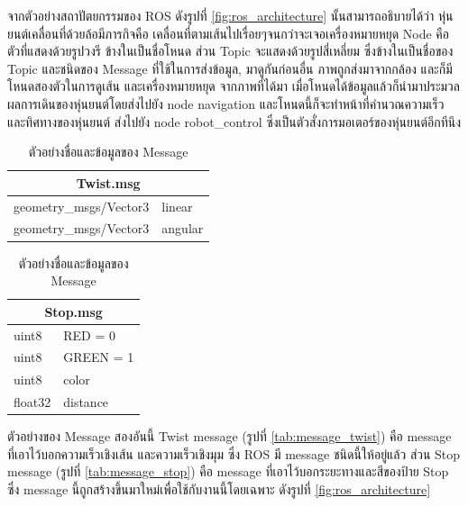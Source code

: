 จากตัวอย่างสถาปัตยกรรมของ ROS ดังรูปที่ \ref{fig:ros_architecture} นั้นสามารถอธิบายได้ว่า หุ่นยนต์เคลื่อนที่ด้วยล้อมีภารกิจคือ
เคลื่อนที่ตามเส้นไปเรื่อยๆจนกว่าจะเจอเครื่องหมายหยุด Node คือตัวที่แสดงด้วยรูปวงรี ข้างในเป็นชื่อโหนด ส่วน Topic จะแสดงด้วยรูปสี่เหลี่ยม
ซึ่งข้างในเป็นชื่อของ Topic และชนิดของ Message ที่ใช้ในการส่งข้อมูล, มาดูกันก่อนอื่น ภาพถูกส่งมาจากกล้อง และก็มีโหนดสองตัวในการดูเส้น และเครื่องหมายหยุด
จากภาพที่ได้มา เมื่อโหนดได้ข้อมูลแล้วก็นำมาประมวลผลการเดินของหุ่นยนต์โดยส่งไปยัง node navigation และโหนดนี้ก็จะทำหน้าที่คำนวณความเร็วและทิศทางของหุ่นยนต์
ส่งไปยัง node robot\_control ซึ่งเป็นตัวสั่งการมอเตอร์ของหุ่นยนต์อีกทีนึง
\begin{table}[htbp]
	\begin{subtable}[h]{0.40\textwidth}
		\centering
		\begin{tabular}{| p{4cm}| p{1.5cm} |}
			\hline 
			\multicolumn{2}{|c|}{Twist.msg} \\
			\hline
			geometry\_msgs/Vector3 & linear  \\
			geometry\_msgs/Vector3 & angular \\
			\hline  
		\end{tabular}
		\caption{Message Twist}
		\label{tab:message_twist}
	\end{subtable}
	\hfill
	\begin{subtable}[h]{0.40\textwidth}
		\centering
		\begin{tabular}{| p{1.5cm}| p{2.5cm} |}
			\hline 
			\multicolumn{2}{|c|}{Stop.msg} \\
			\hline
			uint8   & RED = 0   \\
			uint8   & GREEN = 1 \\
			uint8   & color     \\
			float32 & distance  \\
			\hline  
		\end{tabular}
		\caption{Message Stop}
		\label{tab:message_stop}
	\end{subtable}
	\caption{ตัวอย่างชื่อและข้อมูลของ Message}
	\label{tab:message_example}
\end{table}

ตัวอย่างของ Message สองอันนี้ Twist message (รูปที่ \ref{tab:message_twist}) คือ message ที่เอาไว้บอกความเร็วเชิงเส้น และความเร็วเชิงมุม
ซึ่ง ROS มี message ชนิดนี้ให้อยู่แล้ว ส่วน Stop message (รูปที่ \ref{tab:message_stop}) คือ message ที่เอาไว้บอกระยะทางและสีของป้าย Stop
ซึ่ง message นี้ถูกสร้างขึ้นมาใหม่เพื่อใช้กับงานนี้โดยเฉพาะ ดังรูปที่ \ref{fig:ros_architecture}

